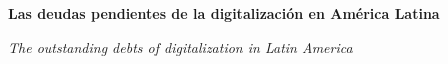 \documentclass{article}
\renewcommand{\normalsize}{\fontsize{10pt}{13pt}\selectfont}
\newcommand{\articulotipo}{}
\newcommand{\articulotitulo}{}
\newcommand{\articulotitulotrans}{}
\newcommand{\articuloautores}{}
\newcommand{\articulodoi}{}
\newcommand{\articuloidiomaxml}{es}
\newcommand{\articulorevista}{}
\newcommand{\articuloissne}{}
\newcommand{\articulovolumen}{}
\newcommand{\articulonumero}{}
\newcommand{\articulofecha}{}
\newcommand{\articulopagina}{0}
\begin{document}

\renewcommand{\articuloidiomaxml}{es}
\renewcommand{\articulotitulo}{Las deudas pendientes de la digitalización en América Latina}
\renewcommand{\articuloautores}{Maria Mora}
\renewcommand{\articulodoi}{10.31637/epsir-2023-898}
\renewcommand{\articulotipo}{EDITORIAL}
\renewcommand{\articulorevista}{Revista Latinoamericana de Estudios Editoriales y Cultura Escrita}
\renewcommand{\articuloissne}{2591-3905}
\renewcommand{\articulovolumen}{01}
\renewcommand{\articulonumero}{01}
\renewcommand{\articulofecha}{ 2026}
\renewcommand{\articulopagina}{1}

\setcounter{page}{1}
\thispagestyle{firstpage}

\noindent\begin{minipage}[t]{\dimexpr\textwidth+\marginparsep+\marginparwidth\relax}%
{\sffamily\bfseries\Large\articulotitulo\par}%
\end{minipage}\par
\vspace{3mm}%
\renewcommand{\articulotitulotrans}{The outstanding debts of digitalization in Latin America}
\noindent\begin{minipage}[t]{\dimexpr\textwidth+\marginparsep+\marginparwidth\relax}%
{\sffamily\itshape\normalsize\articulotitulotrans\par}%
\end{minipage}\par
\vspace{4mm}%
\end{document}
